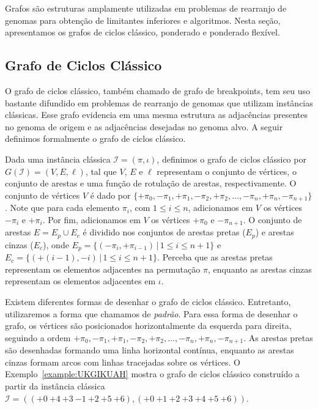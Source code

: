 Grafos são estruturas amplamente utilizadas em problemas de rearranjo de genomas para obtenção de limitantes inferiores e algoritmos. Nesta seção, apresentamos os grafos de ciclos clássico, ponderado e ponderado flexível.

\subsection{Grafo de Ciclos Clássico}\label{subsection:LSNDQWPI}

O grafo de ciclos clássico, também chamado de grafo de breakpoints, tem seu uso bastante difundido em problemas de rearranjo de genomas que utilizam instâncias clássicas. Esse grafo evidencia em uma mesma estrutura as adjacências presentes no genoma de origem e as adjacências desejadas no genoma alvo. A seguir definimos formalmente o grafo de ciclos clássico.

Dada uma instância clássica $\mathcal{I} = (\pi,\iota)$, definimos o grafo de ciclos clássico por $G(\mathcal{I}) = (V, E, \ell)$, tal que $V$, $E$ e $\ell$ representam o conjunto de vértices, o conjunto de arestas e uma função de rotulação de arestas, respectivamente. O conjunto de vértices $V$ é dado por $\{{+\pi_0}, {-\pi_1}, {+\pi_1}, {-\pi_2}, {+\pi_2}, \dots, {-\pi_n}, {+\pi_n}, {-\pi_{n+1}}\}$. Note que para cada elemento $\pi_i$, com $1 \le i \le n$, adicionamos em $V$ os vértices ${-\pi_i}$ e ${+\pi_i}$. Por fim, adicionamos em $V$ os vértices ${+\pi_0}$ e ${-\pi_{n+1}}$. O conjunto de arestas $E = E_p \cup E_c$ é dividido nos conjuntos de arestas pretas ($E_p$) e arestas cinzas ($E_c$), onde $E_p = \{(-\pi_i, +\pi_{i-1}) \,|\, 1 \leq i \leq n+1\}$ e $E_c = \{(+(i-1), -i) \,|\, 1 \leq i \leq n + 1\}$. Perceba que as arestas pretas representam os elementos adjacentes na permutação $\pi$, enquanto as arestas cinzas representam os elementos  adjacentes em $\iota$.

Existem diferentes formas de desenhar o grafo de ciclos clássico. Entretanto, utilizaremos a forma que chamamos de \emph{padrão}. Para essa forma de desenhar o grafo, os vértices são posicionados horizontalmente da esquerda para direita, seguindo a ordem ${+\pi_0}, {-\pi_1}, {+\pi_1}, {-\pi_2}, {+\pi_2}, \dots, {-\pi_n}, {+\pi_n}, {-\pi_{n+1}}$. As arestas pretas são desenhadas formando uma linha horizontal contínua, enquanto as arestas cinzas formam arcos com linhas tracejadas sobre os vértices. O Exemplo~\ref{example:UKGIKUAH} mostra o grafo de ciclos clássico construído a partir da instância clássica $\mathcal{I} = (({+0}~{+4}~{+3}~{-1}~{+2}~{+5}~{+6}),({+0}~{+1}~{+2}~{+3}~{+4}~{+5}~{+6}))$.

